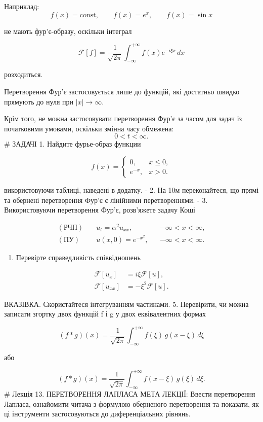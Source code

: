 \documentclass[
  ukrainian,
]{article}
\providecommand{\tightlist}{%
  \setlength{\itemsep}{0pt}\setlength{\parskip}{0pt}}
\begin{document}
Наприклад: \[
f(x)=\text{const}, \qquad f(x)=e^x, \qquad f(x)=\sin x
\]

не мають фур'є-образу, оскільки інтеграл

\[
\mathcal{F}[f] = \frac{1}{\sqrt{2\pi}} \int_{-\infty}^{+\infty} f(x)e^{-i\xi x}\,dx
\]

розходиться.

Перетворення Фур'є застосовується лише до функцій, які достатньо швидко
прямують до нуля при \(|x|\to\infty\).

Крім того, не можна застосовувати перетворення Фур'є за часом для задач
із початковими умовами, оскільки змінна часу обмежена: \[
0 < t < \infty.
\] \# ЗАДАЧІ 1. Найдите фурье-образ функции

\[
f(x)=
\begin{cases}
0, & x \le 0, \\
e^{-x}, & x > 0.
\end{cases}
\]

використовуючи таблиці, наведені в додатку. - 2. На 10м переконайтеся,
що прямі та обернені перетворення Фур'є є лінійними перетвореннями. - 3.
Використовуючи перетворення Фур'є, розв'яжете задачу Коші

\[
\begin{aligned}
(\text{РЧП})\quad & u_t = \alpha^2 u_{xx}, && -\infty < x < \infty,\\
(\text{ПУ})\quad & u(x,0)=e^{-x^2}, && -\infty < x < \infty.
\end{aligned}
\]

\begin{enumerate}
\def\labelenumi{\arabic{enumi}.}
\setcounter{enumi}{3}
\tightlist
\item
  Перевірте справедливість співвідношень
\end{enumerate}

\[
\begin{aligned}
\mathcal{F}\left[u_{x}\right] &= i\xi \mathcal{F}\left[u\right], \\
\mathcal{F}\left[u_{xx}\right] &= -\xi^{2} \mathcal{F}\left[u\right].
\end{aligned}
\]

ВКАЗІВКА. Скористайтеся інтегруванням частинами. 5. Перевірити, чи можна
записати згортку двох функцій f і g у двох еквівалентних формах

\[
(f * g)(x) = \frac{1}{\sqrt{2\pi}} \int_{-\infty}^{+\infty} f(\xi)\, g(x - \xi)\, d\xi
\]

або

\[
(f * g)(x) = \frac{1}{\sqrt{2\pi}} \int_{-\infty}^{+\infty} f(x-\xi)\, g(\xi)\, d\xi.
\] \# Лекція 13. ПЕРЕТВОРЕННЯ ЛАПЛАСА МЕТА ЛЕКЦІЇ: Ввести перетворення
Лапласа, ознайомити читача з формулою оберненого перетворення та
показати, як ці інструменти застосовуються до диференціальних рівнянь.
\end{document}
